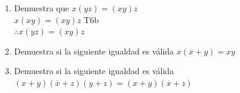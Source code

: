 \documentclass[a4paper,12pt]{article}
\begin{document}
\begin{enumerate}[label=\textcolor{teal}{\textbf{\arabic*.}}]
    \item Demuestra que $x(yz)=(xy)z$ \\
    
        $x(xy) =(xy)z$ T6b\\

        $\therefore x(yz)=(xy)z$ 
    \item Demuestra si la siguiente igualdad es válida $x(\overline{x}+y)=xy$ 
        
            


    \item  Demuestra si la siguiente igualdad es válida $(x+y)(\overline{x}+z)(y+z)=(x+y)(\overline{x}+z)$\\
    

\end{enumerate}
\end{document}
